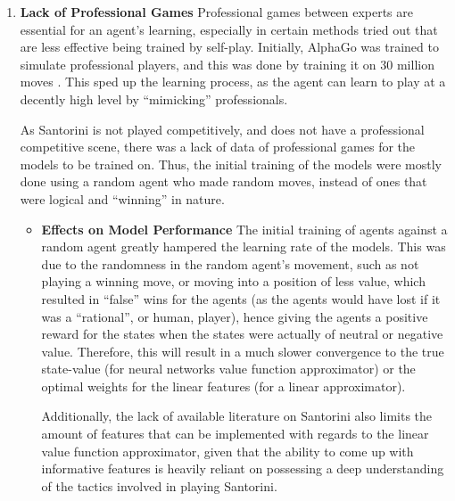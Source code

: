 \documentclass[a4paper,12pt,table]{article}
\begin{document}
\begin{enumerate}
\begin{itemize}
    \end{itemize}

    \item \textbf{Lack of Professional Games}
    \newline
    Professional games between experts are essential for an agent’s learning, especially in certain methods tried out that are less effective being trained by self-play. Initially, AlphaGo was trained to simulate professional players, and this was done by training it on 30 million moves \cite{Mastering the game of Go with deep neural networks and tree search}. This sped up the learning process, as the agent can learn to play at a decently high level by “mimicking” professionals.   \par

    As Santorini is not played competitively, and does not have a professional competitive scene, there was a lack of data of professional games for the models to be trained on. Thus, the initial training of the models were mostly done using a random agent who made random moves, instead of ones that were logical and “winning” in nature.
    
    \begin{itemize}
        \item \textbf{Effects on Model Performance}
        \newline
        The initial training of agents against a random agent greatly hampered the learning rate of the models. This was due to the randomness in the random agent’s movement, such as not playing a winning move, or moving into a position of less value, which resulted in “false” wins for the agents (as the agents would have lost if it was a “rational”, or human, player), hence giving the agents a positive reward for the states when the states were actually of neutral or negative value. Therefore, this will result in a much slower convergence to the true state-value (for neural networks value function approximator) or the optimal weights for the linear features (for a linear approximator).

        Additionally, the lack of available literature on Santorini also limits the amount of features that can be implemented with regards to the linear value function approximator, given that the ability to come up with informative features is heavily reliant on possessing a deep understanding of the tactics involved in playing Santorini.
    
    \end{itemize}


\end{enumerate}
\end{document}
